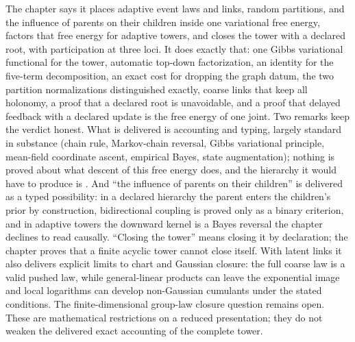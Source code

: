 \begin{verdictbox}{\DELIVERED}
The chapter says it places adaptive event laws and links, random partitions, and the influence of parents
on their children inside one variational free energy, factors that free energy for adaptive towers, and
closes the tower with a declared root, with participation at three loci. It does exactly that: one Gibbs
variational functional for the tower, automatic top-down factorization, an identity for the five-term
decomposition, an exact cost for dropping the graph datum, the two partition normalizations
distinguished exactly, coarse links that keep all holonomy, a proof that a declared root is unavoidable,
and a proof that delayed feedback with a declared update is the free energy of one joint. Two remarks keep
the verdict honest. What is delivered is accounting and typing, largely standard in substance (chain
rule, Markov-chain reversal, Gibbs variational principle, mean-field coordinate ascent, empirical Bayes,
state augmentation); nothing is proved about what descent of this free energy does, and the hierarchy it
would have to produce is . And ``the influence of parents on their
children'' is delivered as a typed possibility: in a declared hierarchy the parent enters the children's
prior by construction, bidirectional coupling is proved only as a binary criterion, and in adaptive
towers the downward kernel is a Bayes reversal the chapter declines to read causally. ``Closing the
tower'' means closing it by declaration; the chapter proves that a finite acyclic tower cannot close
itself.
With latent links it also delivers explicit limits to chart and Gaussian closure: the full coarse
law is a valid pushed law, while general-linear products can leave the exponential image and local
logarithms can develop non-Gaussian cumulants under the stated conditions. The finite-dimensional
group-law closure question remains open. These are mathematical restrictions on a reduced
presentation; they do not weaken the delivered exact accounting of the complete tower.
\end{verdictbox}
